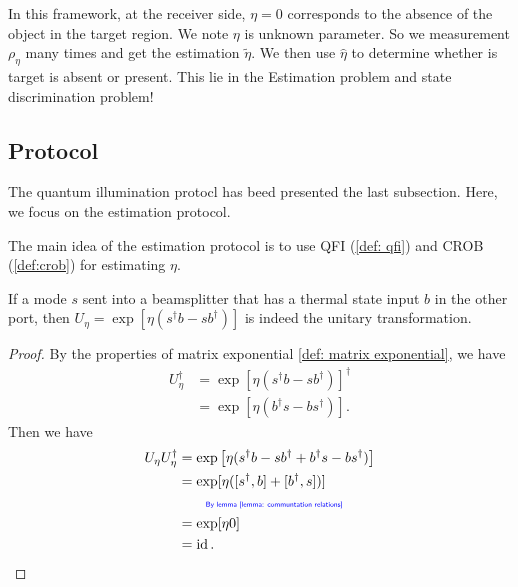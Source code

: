\documentclass[../../note.tex]{subfiles}
\begin{document}
In this framework, at the receiver side, $\eta=0$ corresponds to the absence of the object in the target region. We note $\eta$ is unknown parameter. So we measurement $\rho_{\eta}$ many times and get the estimation $\tilde{\eta}$. We then use $\hat{\eta}$ to determine whether is target is absent or present. This lie in the Estimation problem and state discrimination problem!


\subsection{Protocol}
The quantum illumination protocl has beed presented the last subsection. Here, we focus on the estimation protocol.

The main idea of the estimation protocol is to use QFI (\ref{def: qfi}) and CROB (\ref{def:crob}) for estimating $\eta$.

\begin{lemma}
    If a mode $s$ sent into a beamsplitter that has a thermal state input $b$ in the other port, then $U_{\eta} = \exp[\eta(s^\dagger b - s b^\dagger)]$ is indeed the unitary transformation.
    \label{lemma: unitary transformation}
\end{lemma}
\begin{proof}
    By the properties of matrix exponential \ref{def: matrix exponential}, we have
    \begin{align}
        U_{\eta}^{\dagger}
        &= \exp[\eta(s^\dagger b - s b^\dagger)]^\dagger \\
        &= \exp[\eta(b^\dagger s - b s^\dagger)].
    \end{align}
    Then we have
    \begin{align}
        U_{\eta} U_{\eta}^\dagger
        &= \exp\left[\eta(s^\dagger b - s b^\dagger + b^\dagger s - b s^\dagger)\right] \\
        &= \exp[\eta([s^\dagger, b] + [b^\dagger, s])] \\
        &\qquad\text{\color{blue}{\tiny\sffamily By lemma \ref{lemma: communtation relations}}} \nonumber \\
        &= \exp[\eta 0] \\
        &= \operatorname{id}.
    \end{align}
\end{proof}
\end{document}
